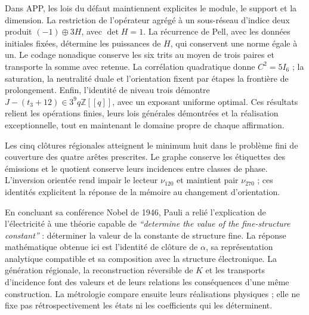 Dans APP, les lois du défaut maintiennent explicites le module, le support et la
dimension. La restriction de l'opérateur agrégé à un sous-réseau
d'indice deux produit \((-1)\oplus3H\), avec \(\det H=1\). La récurrence
de Pell, avec les données initiales fixées, détermine les puissances de
\(H\), qui conservent une norme égale à un. Le codage nonadique conserve
les six trits au moyen de trois paires et transporte la somme avec retenue.
La corrélation quadratique donne \(C^2=5I_6\) ; la saturation, la neutralité
duale et l'orientation fixent par étapes la frontière de prolongement.
Enfin, l'identité de niveau trois démontre
\(J-(t_3+12)\in3^9q\mathbb Z[[q]]\), avec un exposant uniforme optimal.
Ces résultats relient les opérations finies, leurs lois générales
démontrées et la réalisation exceptionnelle, tout en maintenant le domaine propre
de chaque affirmation.

Les cinq clôtures régionales atteignent le minimum huit dans le problème fini de couverture des quatre arêtes prescrites. Le graphe conserve les étiquettes des émissions et le quotient conserve leurs incidences entre classes de phase. L'inversion orientée rend impair le lecteur \(\nu_{120}\) et maintient pair \(\nu_{270}\) ; ces identités explicitent la réponse de la mémoire au changement d'orientation.
\par %




En concluant sa conférence Nobel de 1946, Pauli a relié l'explication de l'électricité à une théorie capable de \emph{“determine the value of the fine-structure constant”}\cite{pauli1946} : déterminer la valeur de la constante de structure fine. La réponse mathématique obtenue ici est l'identité de clôture de \(\alpha\), sa représentation analytique compatible et sa composition avec la structure électronique. La génération régionale, la reconstruction réversible de \(K\) et les transports d'incidence font des valeurs et de leurs relations les conséquences d'une même construction. La métrologie compare ensuite leurs réalisations physiques ; elle ne fixe pas rétrospectivement les états ni les coefficients qui les déterminent.



\par\endgroup
